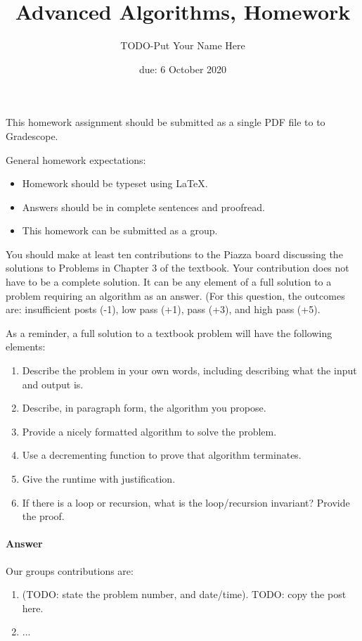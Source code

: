 \documentclass{article}
\title{Advanced Algorithms, Homework \hwnum}
\author{TODO-Put Your Name Here}
\date{due: 6 October 2020}
\begin{document}
\maketitle

This homework assignment should be
submitted as a single PDF file to to Gradescope.

General homework expectations:
\begin{itemize}
    \item Homework should be typeset using \LaTeX.
    \item Answers should be in complete sentences and proofread.
    \item This homework can be submitted as a group.
\end{itemize}

\nextprob
{}

You should make at least ten contributions to the Piazza board
discussing the solutions to Problems in Chapter 3 of the textbook.  Your
contribution does not have to be a complete solution.  It can be any element of
a full solution to a problem requiring an algorithm as an answer.  (For this
question, the outcomes are: insufficient posts (-1), low pass (+1), pass (+3),
and high pass (+5).

As a reminder, a full solution to a textbook problem will have the following elements:
\begin{enumerate}
    \item Describe the problem in your own words, including
        describing what the input and output is.
    \item Describe, in paragraph form, the algorithm you propose.
    \item Provide a nicely formatted algorithm to solve the problem.
    \item Use a decrementing function to prove that algorithm terminates.
    \item Give the runtime with justification.
    \item If there is a loop or recursion, what is the loop/recursion invariant? Provide the proof.
\end{enumerate}

\paragraph{Answer}


Our groups contributions are:
\begin{enumerate}
    \item (TODO: state the problem number, and date/time). TODO:
        copy the post here.
    \item ...
\end{enumerate}
\end{document}
